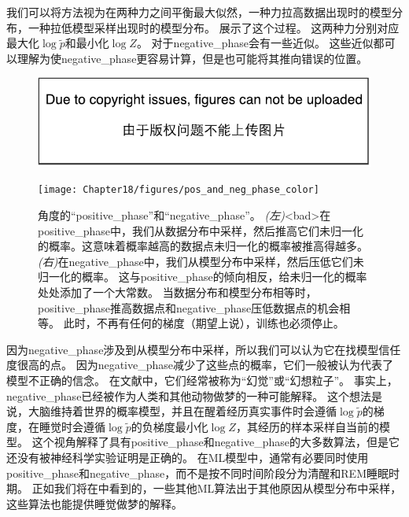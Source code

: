 我们可以将方法视为在两种力之间平衡最大似然，一种力拉高数据出现时的模型分布，一种拉低模型采样出现时的模型分布。
展示了这个过程。
这两种力分别对应最大化$\log \tilde{p}$和最小化$\log Z$。
对于\gls{negative_phase}会有一些近似。
这些近似都可以理解为使\gls{negative_phase}更容易计算，但是也可能将其推向错误的位置。

\begin{figure}[!htb]
\ifOpenSource
\centerline{\includegraphics{figure.pdf}}
\else
\centerline{\texttt{[image: Chapter18/figures/pos\_and\_neg\_phase\_color]}}
\fi
\caption{角度的``\gls{positive_phase}''和``\gls{negative_phase}''。
\emph{(左)}<bad>在\gls{positive_phase}中，我们从数据分布中采样，然后推高它们未归一化的概率。这意味着概率越高的数据点未归一化的概率被推高得越多。
\emph{(右)}在\gls{negative_phase}中，我们从模型分布中采样，然后压低它们未归一化的概率。
这与\gls{positive_phase}的倾向相反，给未归一化的概率处处添加了一个大常数。
当数据分布和模型分布相等时，\gls{positive_phase}推高数据点和\gls{negative_phase}压低数据点的机会相等。
此时，不再有任何的梯度（期望上说），训练也必须停止。}
\label{fig:chap18_pos_and_neg_phase}
\end{figure}


因为\gls{negative_phase}涉及到从模型分布中采样，所以我们可以认为它在找模型信任度很高的点。
因为\gls{negative_phase}减少了这些点的概率，它们一般被认为代表了模型不正确的信念。
在文献中，它们经常被称为``幻觉''或``幻想粒子''。
事实上，\gls{negative_phase}已经被作为人类和其他动物做梦的一种可能解释\citep{CrickMitchison83}。
这个想法是说，大脑维持着世界的概率模型，并且在醒着经历真实事件时会遵循$\log \tilde{p}$的梯度，在睡觉时会遵循$\log \tilde{p}$的负梯度最小化$\log Z$，其经历的样本采样自当前的模型。
这个视角解释了具有\gls{positive_phase}和\gls{negative_phase}的大多数算法，但是它还没有被神经科学实验证明是正确的。
在\gls{ML}模型中，通常有必要同时使用\gls{positive_phase}和\gls{negative_phase}，而不是按不同时间阶段分为清醒和REM睡眠时期。
正如我们将在中看到的，一些其他\gls{ML}算法出于其他原因从模型分布中采样，这些算法也能提供睡觉做梦的解释。


